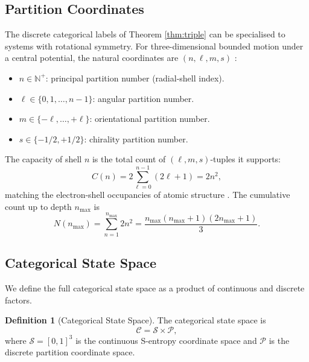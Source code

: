 \documentclass[twocolumn,10pt,a4paper]{article}
\theoremstyle{definition}
\newtheorem{definition}[theorem]{Definition}
\theoremstyle{remark}
\newcommand{\Partition}{\mathcal{P}}
\newcommand{\Cspace}{\mathcal{C}}
\newcommand{\Sspace}{\mathcal{S}}
\newcommand{\Natural}{\mathbb{N}}
\begin{document}
\subsection{Partition Coordinates}

The discrete categorical labels of Theorem \ref{thm:triple} can be specialised to systems with rotational symmetry. For three-dimensional bounded motion under a central potential, the natural coordinates are $(n, \ell, m, s)$ \citep{griffiths2018,landau1977qm}:

\begin{itemize}[leftmargin=1.2em,nosep]
\item $n \in \Natural^{+}$: principal partition number (radial-shell index).
\item $\ell \in \{0, 1, \ldots, n-1\}$: angular partition number.
\item $m \in \{-\ell, \ldots, +\ell\}$: orientational partition number.
\item $s \in \{-1/2, +1/2\}$: chirality partition number.
\end{itemize}

The capacity of shell $n$ is the total count of $(\ell, m, s)$-tuples it supports:
\begin{equation}
C(n) = 2\sum_{\ell=0}^{n-1}(2\ell+1) = 2n^2,
\label{eq:capacity}
\end{equation}
matching the electron-shell occupancies of atomic structure \citep{bohr1913,pauli1925}. The cumulative count up to depth $n_{\max}$ is
\begin{equation}
N(n_{\max}) = \sum_{n=1}^{n_{\max}} 2n^2 = \frac{n_{\max}(n_{\max}+1)(2n_{\max}+1)}{3}.
\label{eq:cumulative_count}
\end{equation}

\subsection{Categorical State Space}

We define the full categorical state space as a product of continuous and discrete factors.

\begin{definition}[Categorical State Space]
\label{def:categorical_space}
The categorical state space is
\begin{equation}
\Cspace = \Sspace \times \Partition,
\end{equation}
where $\Sspace = [0, 1]^3$ is the continuous S-entropy coordinate space and $\Partition$ is the discrete partition coordinate space.
\end{definition}
\end{document}
